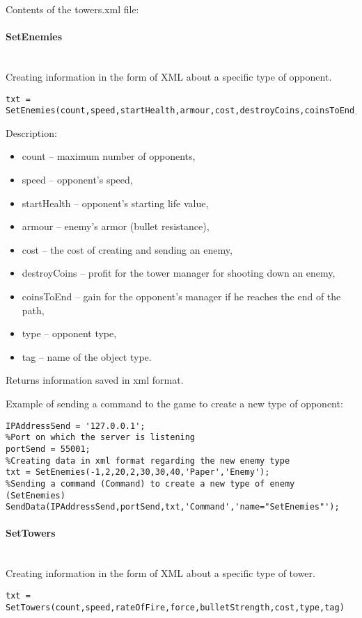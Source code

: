 Contents of the towers.xml file:


\paragraph{SetEnemies} \hspace{0pt} \\
Creating information in the form of XML about a specific type of opponent.
\begin{lstlisting}[style=Matlab-editor]
txt = SetEnemies(count,speed,startHealth,armour,cost,destroyCoins,coinsToEnd,type,tag)
\end{lstlisting}

Description:
\begin{itemize}
\item count -- maximum number of opponents,
\item speed -- opponent's speed,
\item startHealth -- opponent's starting life value,
\item armour -- enemy's armor (bullet resistance),
\item cost -- the cost of creating and sending an enemy,
\item destroyCoins -- profit for the tower manager for shooting down an enemy,
\item coinsToEnd -- gain for the opponent's manager if he reaches the end of the path,
\item type -- opponent type,
\item tag -- name of the object type.
\end{itemize}

Returns information saved in xml format.

Example of sending a command to the game to create a new type of opponent:
\begin{lstlisting}[style=Matlab-editor]
%Server address
IPAddressSend = '127.0.0.1';
%Port on which the server is listening
portSend = 55001;
%Creating data in xml format regarding the new enemy type
txt = SetEnemies(-1,2,20,2,30,30,40,'Paper','Enemy');
%Sending a command (Command) to create a new type of enemy (SetEnemies)
SendData(IPAddressSend,portSend,txt,'Command','name="SetEnemies"');
\end{lstlisting}

\paragraph{SetTowers} \hspace{0pt} \\
Creating information in the form of XML about a specific type of tower.
\begin{lstlisting}[style=Matlab-editor]
txt = SetTowers(count,speed,rateOfFire,force,bulletStrength,cost,type,tag)
\end{lstlisting}

